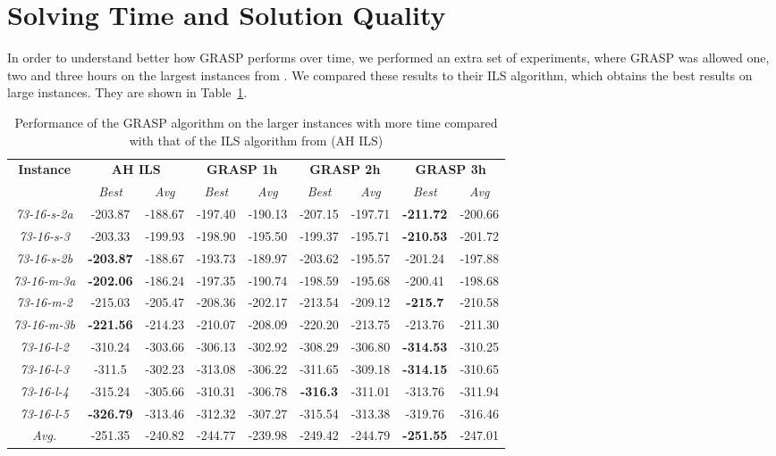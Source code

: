 \documentclass[a4paper,11pt,authoryear]{elsarticle}
\begin{document}
\section{Solving Time and Solution Quality}
\label{appendix:allowingextratime}
\noindent In order to understand better how GRASP performs over time, we performed an extra set of experiments, where GRASP was allowed one, two and three hours on the largest instances from \cite{aithaddadene2016}. We compared these results to their ILS algorithm, which obtains the best results on large instances. They are shown in Table~\ref{table:longerexperiments}.
{\scriptsize
\begin{longtable}{c|cc|cc|cc|cc}
\caption{Performance of the GRASP algorithm on the larger instances with more time compared with that of the ILS algorithm from \cite{aithaddadene2016} (AH ILS)}
\label{table:longerexperiments}\\
\hline
\textbf{Instance}  & \multicolumn{2}{c|}{\textbf{AH ILS}} & \multicolumn{2}{c|}{\textbf{GRASP 1h}} & \multicolumn{2}{c|}{\textbf{GRASP 2h}} & \multicolumn{2}{c}{\textbf{GRASP 3h}}\\
    & \emph{Best} & \emph{Avg} & \emph{Best} & \emph{Avg} & \emph{Best} & \emph{Avg} & \emph{Best} & \emph{Avg}\\
\hline                                              
    \hline																		
        \emph{73-16-s-2a}   	&	-203.87	&	-188.67	&	-197.40	&	-190.13	&	-207.15	&	-197.71	&	\textbf{-211.72}	&	-200.66	    \\	
        \emph{73-16-s-3}    	&	-203.33	&	-199.93	&	-198.90	&	-195.50	&	-199.37	&	-195.71	&	\textbf{-210.53}	&	-201.72	    \\	
        \emph{73-16-s-2b}   	&	\textbf{-203.87}	&	-188.67	&	-193.73	&	-189.97	&	-203.62	&	-195.57	&	-201.24	&	-197.88	    \\	
        \emph{73-16-m-3a}   	&	\textbf{-202.06}	&	-186.24	&	-197.35	&	-190.74	&	-198.59	&	-195.68	&	-200.41	&	-198.68	    \\	
        \emph{73-16-m-2}    	&	-215.03	&	-205.47	&	-208.36	&	-202.17	&	-213.54	&	-209.12	&	\textbf{-215.7}	&	-210.58	    \\	
        \emph{73-16-m-3b}   	&	\textbf{-221.56}	&	-214.23	&	-210.07	&	-208.09	&	-220.20	&	-213.75	&	-213.76	&	-211.30	    \\	
        \emph{73-16-l-2}    	&	-310.24	&	-303.66	&	-306.13	&	-302.92	&	-308.29	&	-306.80	&	\textbf{-314.53}	&	-310.25	    \\	
        \emph{73-16-l-3}    	&	-311.5	&	-302.23	&	-313.08	&	-306.22	&	-311.65	&	-309.18	&	\textbf{-314.15}	&	-310.65	    \\	
        \emph{73-16-l-4}    	&	-315.24	&	-305.66	&	-310.31	&	-306.78	&	\textbf{-316.3}	&	-311.01	&	-313.76	&	-311.94	    \\	
        \emph{73-16-l-5}    	&	\textbf{-326.79}	&	-313.46	&	-312.32	&	-307.27	&	-315.54	&	-313.38	&	-319.76	&	-316.46	    \\	\hline
\emph{Avg.}	&	-251.35	&	-240.82	&	-244.77	&	-239.98	&	-249.42	&	-244.79	&	\textbf{-251.55}	&	-247.01	    \\	

\hline
\end{longtable}
}
\end{document}
